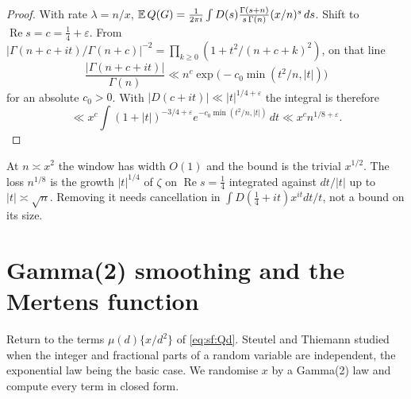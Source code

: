 \begin{proof}
With rate $\lambda=n/x$, $\mathbb{E}\,Q(G)=\frac1{2\pi i}\int D(s)\frac{\Gamma(s+n)}{s\,\Gamma(n)}(x/n)^s\,ds$. Shift to $\operatorname{Re} s=c=\frac14+\varepsilon$. From $|\Gamma(n+c+it)/\Gamma(n+c)|^{-2}=\prod_{k\ge0}(1+t^2/(n+c+k)^2)$, on that line
\[
\frac{|\Gamma(n+c+it)|}{\Gamma(n)}\ll n^c\exp\bigl(-c_0\min(t^2/n,|t|)\bigr)
\]
for an absolute $c_0>0$. With $|D(c+it)|\ll|t|^{1/4+\varepsilon}$ the integral is therefore
\[
\ll x^c\int(1+|t|)^{-3/4+\varepsilon}e^{-c_0\min(t^2/n,|t|)}\,dt\ll x^cn^{1/8+\varepsilon}.
\]
\end{proof}

At $n\asymp x^2$ the window has width $O(1)$ and the bound is the trivial $x^{1/2}$. The loss $n^{1/8}$ is the growth $|t|^{1/4}$ of $\zeta$ on $\operatorname{Re} s=\frac14$ integrated against $dt/|t|$ up to $|t|\asymp\sqrt n$. Removing it needs cancellation in $\int D(\frac14+it)x^{it}dt/t$, not a bound on its size.


\section{Gamma(2) smoothing and the Mertens function}\label{sec:sf:gamma2}

Return to the terms $\mu(d)\{x/d^2\}$ of \eqref{eq:sf:Qd}. Steutel and Thiemann \cite{steutelthiemann1989} studied when the integer and fractional parts of a random variable are independent, the exponential law being the basic case. We randomise $x$ by a Gamma(2) law and compute every term in closed form.

